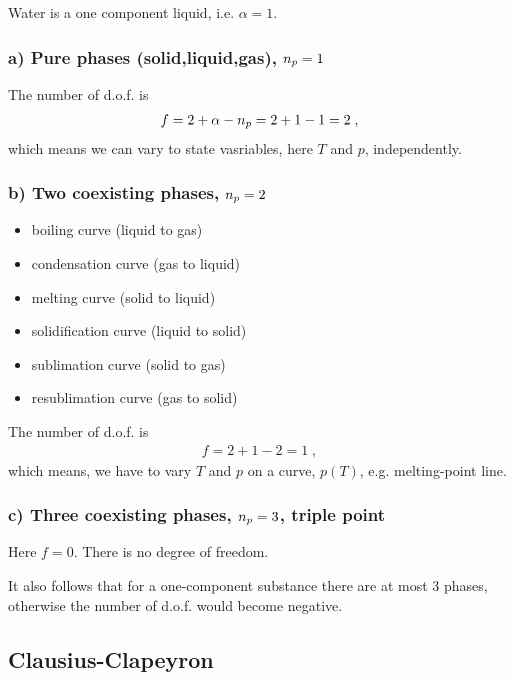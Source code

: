 Water is a one component liquid, i.e. $\alpha=1$. 

\subsubsection{a) Pure phases (solid,liquid,gas), $n_{p} =1$}

The number of d.o.f. is 
%
\begin{align*}
f = 2 + \alpha -n_{p}  = 2 + 1 - 1 = 2\;,
\end{align*}
%
which means we can vary to state vasriables, here $T$ and $p$, independently.

\subsubsection{b) Two coexisting phases, $n_{p} =2$}
\begin{itemize}
   \item boiling curve (liquid to gas)
 \item condensation curve (gas to liquid)
	\item melting curve (solid to liquid)
 \item solidification curve (liquid to solid)

\item sublimation curve (solid to gas)
\item resublimation curve (gas to solid)
	
\end{itemize}


The number of d.o.f. is 
%
\begin{align*}
f = 2 + 1 - 2 = 1\;,
\end{align*}
%
which means, we have to vary  $T$ and $p$ on a curve, $p(T)$, e.g. melting-point line.



\subsubsection{c) Three coexisting phases, $n_{p} =3$, triple point}

Here $f=0$. There is no degree of freedom. 

It also follows that for a one-component substance there are at most 3 phases, otherwise the
number of d.o.f. would become negative.


\subsection{Clausius-Clapeyron}


